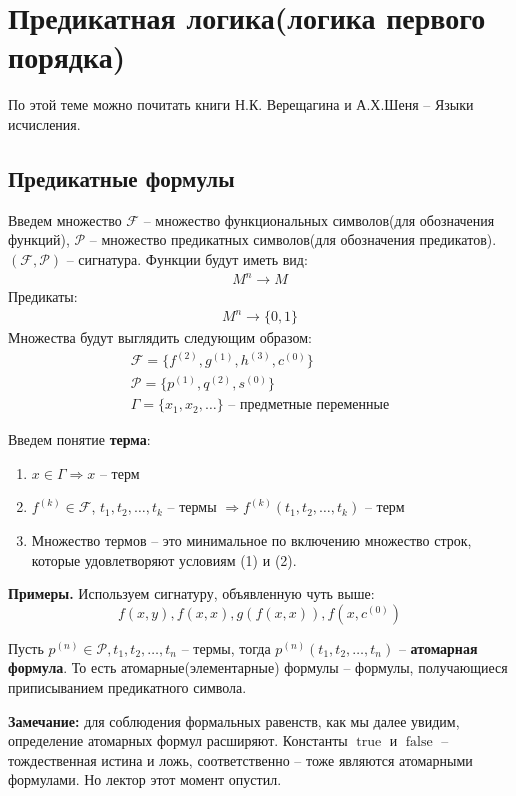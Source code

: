 \section{Предикатная логика(логика первого порядка)}
По этой теме можно почитать книги Н.К. Верещагина и А.Х.Шеня -- Языки исчисления. 
\subsection{Предикатные формулы}
\begin{conj}
    Введем множество $\mathcal{F}$ -- множество функциональных символов(для обозначения функций), $\mathcal{P}$ -- множество предикатных символов(для обозначения предикатов).
    $(\mathcal{F}, \mathcal{P})$ -- сигнатура. 
    Функции будут иметь вид:
    \begin{gather*}
        M^n \longrightarrow M
    \end{gather*} 
    Предикаты:
    \begin{gather*}
        M^n \longrightarrow \{0, 1\} 
    \end{gather*}
    Множества будут выглядить следующим образом:
    \begin{gather*}
        \mathcal{F} = \{f^{(2)}, g^{(1)}, h^{(3)}, c^{(0)}\} \\
        \mathcal{P} = \{p^{(1)}, q^{(2 )}, s^{(0)}\} \\
        \Gamma = \{x_1, x_2, \dots\} \text{ -- предметные переменные}
    \end{gather*}
\end{conj}
\begin{conj}
    Введем понятие \textbf{терма}:
    \begin{enumerate}
        \item $x \in \Gamma \Longrightarrow x$ -- терм 
        \item $f^{(k)} \in \mathcal{F}$, $t_1, t_2, \dots, t_k$ -- термы $\Longrightarrow f^{(k)} (t_1, t_2, \dots, t_k)$ -- терм
        \item Множество термов -- это минимальное по включению множество строк, которые удовлетворяют условиям (1) и (2). 
    \end{enumerate}
\end{conj}

\textbf{Примеры.} Используем сигнатуру, объявленную чуть выше: \[ f(x, y), f(x, x), g(f(x, x)), f(x, c^{(0)}) \]

\vspace{3mm}

\begin{conj}
    Пусть $p^{(n)} \in \mathcal{P}, t_1, t_2, \dots, t_n$ -- термы, тогда 
    $p^{(n)} (t_1, t_2, \dots, t_n)$ -- \textbf{атомарная формула}. То есть атомарные(элементарные) формулы -- формулы, получающиеся
    приписыванием предикатного символа.  
\end{conj}
\textbf{Замечание: } для соблюдения формальных равенств, как мы далее увидим, определение атомарных формул расширяют. Константы $\operatorname{true}$ и $\operatorname{false}$ -- тождественная истина и ложь, соответственно -- тоже являются атомарными формулами. Но лектор этот момент опустил.

